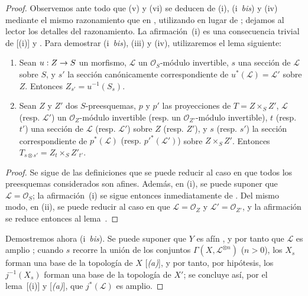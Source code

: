\documentclass[oneside,10pt]{amsart}
\makeatletter
\newcommand{\ega@arrow}[2]{\mathchoice{#1}{#2}{#2}{#2}}
\renewcommand{\to}{\ega@arrow{\longrightarrow}{\rightarrow}}
\let\EGAOriginalLabel\label
\renewcommand{\label}[1]{\phantomsection\EGAOriginalLabel{#1}}
\makeatother
\begin{document}
\begin{proof}
Observemos ante todo que (v) y (vi) se deducen de (i), (i~\emph{bis}) y (iv) mediante el mismo razonamiento que en , utilizando  en lugar de ;
dejamos al lector los detalles del razonamiento.
La afirmación~(i) es una consecuencia trivial de [(i)] y .
Para demostrar (i~\emph{bis}), (iii) y (iv), utilizaremos el lema siguiente:
  \begin{lemma}[4.6.13.1]
  \label{II.4.6.13.1-fr}
  \begin{enumerate}
    \item[\rm{(i)}] Sean $u:Z\to S$ un morfismo, $\mathcal{L}$ un $\mathcal{O}_S$-módulo invertible, $s$ una sección de $\mathcal{L}$ sobre $S$, y $s'$ la sección canónicamente correspondiente de $u^*(\mathcal{L})=\mathcal{L}'$ sobre $Z$.
      Entonces $Z_{s'}=u^{-1}(S_s)$.
    \item[\rm{(ii)}] Sean $Z$ y $Z'$ dos $S$-preesquemas, $p$ y $p'$ las proyecciones de $T=Z\times_S Z'$, $\mathcal{L}$ \textup{(resp. $\mathcal{L}'$)} un $\mathcal{O}_Z$-módulo invertible \textup{(resp.} un $\mathcal{O}_{Z'}$-módulo invertible\textup{)}, $t$ \textup{(resp. $t'$)} una sección de $\mathcal{L}$ \textup{(resp. $\mathcal{L}'$)} sobre $Z$ \textup{(resp. $Z'$)}, y $s$ \textup{(resp. $s'$)} la sección correspondiente de $p^*(\mathcal{L})$ \textup{(resp. $p'^*(\mathcal{L}')$)} sobre $Z\times_S Z'$.
      Entonces $T_{s\otimes s'}=Z_t\times_S Z'_{t'}$.
  \end{enumerate}
  \end{lemma}

  \begin{proof}
  Se sigue de las definiciones que se puede reducir al caso en que todos los preesquemas considerados son afines.
  Además, en (i), se puede suponer que $\mathcal{L}=\mathcal{O}_S$;
  la afirmación~(i) se sigue entonces inmediatamente de .
  Del mismo modo, en (ii), se puede reducir al caso en que $\mathcal{L}=\mathcal{O}_Z$ y $\mathcal{L}'=\mathcal{O}_{Z'}$, y la afirmación se reduce entonces al lema~.
  \end{proof}

Demostremos ahora (i~\emph{bis}).
Se puede suponer que $Y$ es afín , y por tanto que $\mathcal{L}$ es amplio ;
cuando $s$ recorre la unión de los conjuntos $\Gamma(X,\mathcal{L}^{\otimes n})$ ($n>0$), los $X_s$ forman una base de la topología de $X$ [\emph{(a)}], y por tanto, por hipótesis, los $j^{-1}(X_s)$ forman una base de la topología de $X'$;
se concluye así, por el lema~[(i)] y [\emph{(a)}], que $j^*(\mathcal{L})$ es amplio.


\end{proof}
\end{document}
